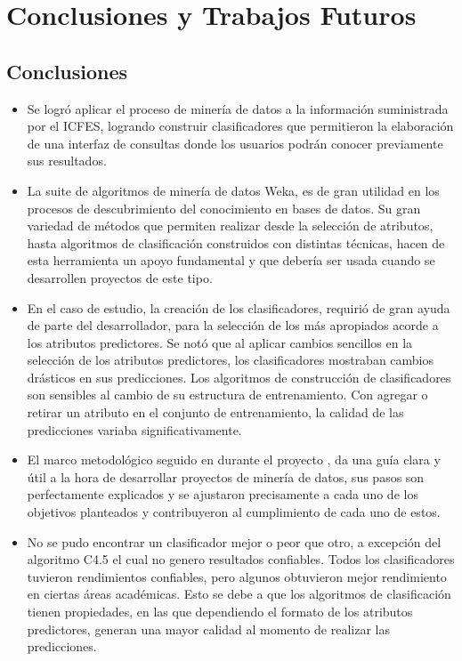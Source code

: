 \chapter{Conclusiones y Trabajos Futuros}
\section{Conclusiones}
\begin{itemize}
\item Se logró aplicar el proceso de minería de datos a la información suministrada por el ICFES, logrando construir clasificadores que permitieron la elaboración de una interfaz de consultas donde los usuarios podrán conocer previamente sus resultados.

\item La suite de algoritmos de minería de datos Weka, es de gran utilidad en los procesos de descubrimiento del conocimiento en bases de datos. Su gran variedad de métodos que permiten realizar desde la selección de atributos, hasta algoritmos de clasificación construidos con distintas técnicas, hacen de esta herramienta un apoyo fundamental y que debería ser usada cuando se desarrollen proyectos de este tipo.
 
\item En el caso de estudio, la creación de los clasificadores, requirió de gran ayuda de parte del desarrollador, para la selección de los más apropiados acorde a los atributos predictores. Se notó que al aplicar cambios sencillos en la selección de los atributos predictores, los clasificadores mostraban cambios drásticos en sus predicciones. Los algoritmos de construcción de clasificadores son sensibles al cambio de su estructura de entrenamiento. Con agregar o retirar un atributo en el conjunto de entrenamiento, la calidad de las predicciones variaba significativamente.

\item El marco metodológico seguido en durante el proyecto \cite{key-50}, da una guía clara y útil a la hora de desarrollar proyectos de minería de datos, sus pasos son perfectamente explicados y se ajustaron precisamente a cada uno de los objetivos planteados  y contribuyeron al cumplimiento de cada uno de estos.

\item No se pudo encontrar un clasificador mejor o peor que otro, a excepción del algoritmo C4.5 el cual no genero resultados confiables. Todos los clasificadores tuvieron rendimientos confiables, pero algunos obtuvieron mejor rendimiento en ciertas áreas académicas. Esto se debe a que los algoritmos de clasificación tienen propiedades, en las que dependiendo el formato de los atributos predictores, generan una mayor calidad al momento de realizar las predicciones.


\end{itemize}
